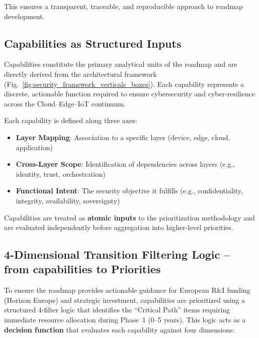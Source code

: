\documentclass{ieeeaccess}
\begin{document}
This ensures a transparent, traceable, and reproducible approach to roadmap development.




\subsection{Capabilities as Structured Inputs}

Capabilities constitute the primary analytical units of the roadmap and are directly derived from the architectural framework (Fig.~\ref{fig:security_framework_verticals_boxes}). Each capability represents a discrete, actionable function required to ensure cybersecurity and cyber-resilience across the Cloud--Edge--IoT continuum.

Each capability is defined along three axes:

\begin{itemize}
    \item \textbf{Layer Mapping}: Association to a specific layer (device, edge, cloud, application)
    \item \textbf{Cross-Layer Scope}: Identification of dependencies across layers (e.g., identity, trust, orchestration)
    \item \textbf{Functional Intent}: The security objective it fulfills (e.g., confidentiality, integrity, availability, sovereignty)
\end{itemize}

Capabilities are treated as \textbf{atomic inputs} to the prioritization methodology and are evaluated independently before aggregation into higher-level priorities.


\subsection{4-Dimensional Transition Filtering Logic -- from capabilities to Priorities}

To ensure the roadmap provides actionable guidance for European R\&I funding (Horizon Europe) and strategic investment, capabilities are prioritized using a structured 4-filter logic that identifies the ``Critical Path'' items requiring immediate resource allocation during Phase~1 (0--5 years). This logic acts as a \textbf{decision function} that evaluates each capability against four dimensions:
\end{document}
